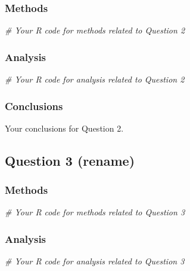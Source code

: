 \documentclass[
]{article}
\newenvironment{Shaded}{\begin{snugshade}}{\end{snugshade}}
\newcommand{\CommentTok}[1]{\textcolor[rgb]{0.56,0.35,0.01}{\textit{#1}}}
\begin{document}
\subsubsection{Methods}\label{methods-2}

\begin{Shaded}
\begin{Highlighting}[]
\CommentTok{\# Your R code for methods related to Question 2}
\end{Highlighting}
\end{Shaded}

\subsubsection{Analysis}\label{analysis-2}

\begin{Shaded}
\begin{Highlighting}[]
\CommentTok{\# Your R code for analysis related to Question 2}
\end{Highlighting}
\end{Shaded}

\subsubsection{Conclusions}\label{conclusions-2}

Your conclusions for Question 2.

\subsection{Question 3 (rename)}\label{question-3-rename}

\subsubsection{Methods}\label{methods-3}

\begin{Shaded}
\begin{Highlighting}[]
\CommentTok{\# Your R code for methods related to Question 3}
\end{Highlighting}
\end{Shaded}

\subsubsection{Analysis}\label{analysis-3}

\begin{Shaded}
\begin{Highlighting}[]
\CommentTok{\# Your R code for analysis related to Question 3}
\end{Highlighting}
\end{Shaded}
\end{document}
